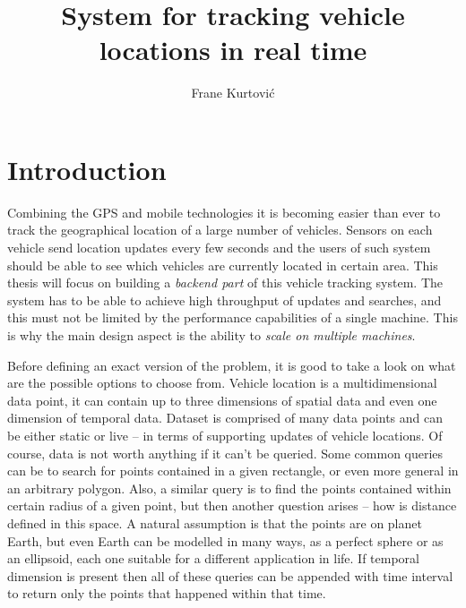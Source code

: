 \documentclass[times, utf8, diplomski]{fer}
\begin{document}

\title{System for tracking vehicle locations in real time}

\author{Frane Kurtović}

\maketitle

\izvornik


\tableofcontents















\chapter{Introduction}
Combining the GPS and mobile technologies it is becoming easier than ever to track the geographical location of a large number of vehicles. Sensors on each vehicle send location updates every few seconds and the users of such system should be able to see which vehicles are currently located in certain area. This thesis will focus on building a \emph{backend part} of this vehicle tracking system. The system has to be able to achieve high throughput of updates and searches, and this must not be limited by the performance capabilities of a single machine. This is why the main design aspect is the ability to \emph{scale on multiple machines}.

Before defining an exact version of the problem, it is good to take a look on what are the possible options to choose from. Vehicle location is a multidimensional data point, it can contain up to three dimensions of spatial data and even one dimension of temporal data. Dataset is comprised of many data points and can be either static or live -- in terms of supporting updates of vehicle locations. Of course, data is not worth anything if it can't be queried. Some common queries can be to search for points contained in a given rectangle, or even more general in an arbitrary polygon. Also, a similar query is to find the points contained within certain radius of a given point, but then another question arises -- how is distance defined in this space. A natural assumption is that the points are on planet Earth, but even Earth can be modelled in many ways, as a perfect sphere or as an ellipsoid, each one suitable for a different application in life. If temporal dimension is present then all of these queries can be appended with time interval to return only the points that happened within that time.
\end{document}
